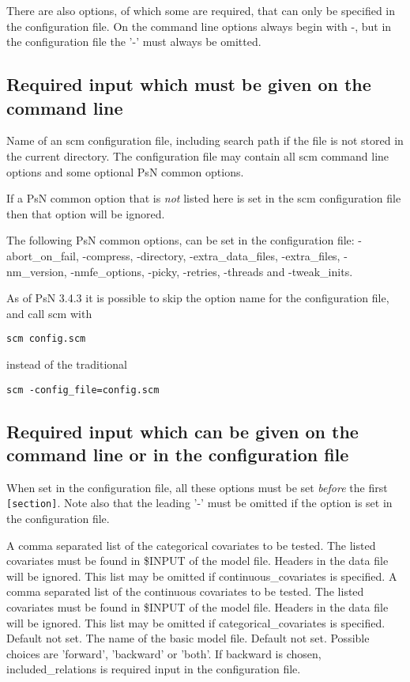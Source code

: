 There are also options, of which some are required, that can only be specified in the configuration file. On the command line options always begin with -, but in the configuration file the '-' must always be omitted.

\subsection{Required input which must be given on the command line}
\begin{optionlist}
Name of an scm configuration file, including search path if the file is not stored in the current directory. The configuration file may contain all scm command line options and some optional PsN common options.

If a PsN common option that is \emph{not} listed here is set in the scm configuration file then that option will be ignored.

The following PsN common options, can be set in the configuration file: \mbox{-abort\_on\_fail}, \mbox{-compress}, \mbox{-directory}, \mbox{-extra\_data\_files}, \mbox{-extra\_files}, \mbox{-nm\_version}, \mbox{-nmfe\_options}, \mbox{-picky}, \mbox{-retries}, \mbox{-threads} and \mbox{-tweak\_inits}. 
\nextopt
\end{optionlist}
As of PsN 3.4.3 it is possible to skip the option name for the configuration file, and call scm with
\begin{verbatim}
scm config.scm 
\end{verbatim}
instead of the traditional
\begin{verbatim}
scm -config_file=config.scm
\end{verbatim}

\subsection{Required input which can be given on the\\ command line or in the configuration file}
When set in the configuration file, all these options must be set \emph{before} the first  \verb|[section]|. Note also that the leading '-' must be omitted if the option is set in the configuration file.
\begin{optionlist}
A comma separated list of the categorical covariates to be tested. The listed covariates must be found in \$INPUT of the model file. Headers in the data file will be ignored. This list may be omitted if continuous\_covariates is specified. 
\nextopt
{}
A comma separated list of the continuous covariates to be tested. The listed covariates must be found in \$INPUT of the model file. Headers in the data file will be ignored. This list may be omitted if categorical\_covariates is specified. 
\nextopt
{}
Default not set. The name of the basic model file. 
\nextopt
{}
Default not set. Possible choices are 'forward', 'backward' or 'both'. If backward is chosen, included\_relations is required input in the configuration file. 
\nextopt
\end{optionlist}

